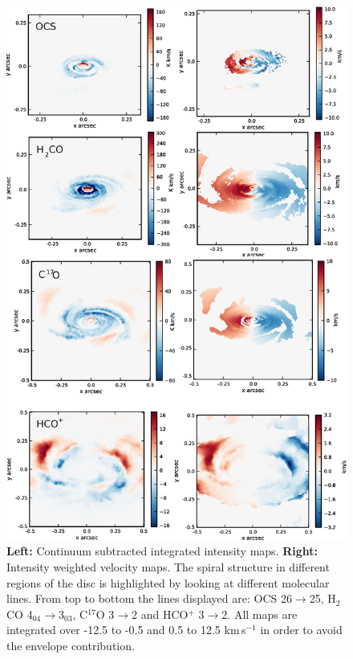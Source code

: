 \documentclass[useAMS,usenatbib]{mn2e}
\begin{document}
\begin{figure}
 \includegraphics[width=150mm]{Figures/sim/imageALL_30deg_all.eps}
 \caption{{\bf Left:} Continuum subtracted integrated intensity maps. {\bf Right:} Intensity weighted velocity maps. The spiral structure in different regions of the disc is highlighted by looking at different molecular lines. From top to bottom the lines displayed are: OCS 26$\rightarrow$25, H$_2$CO 4$_{04}$$\rightarrow$3$_{03}$, C$^{17}$O 3$\rightarrow$2 and HCO$^+$ 3$\rightarrow$2. All maps are integrated over -12.5 to -0.5 and 0.5 to 12.5 km$\,$s$^{-1}$ in order to avoid the envelope contribution.}
 \label{sim_all}
\end{figure}
\end{document}
